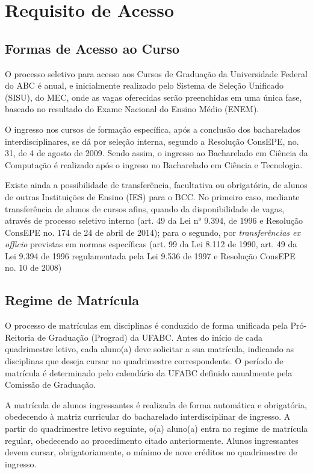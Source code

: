 \section {Requisito de Acesso}

\subsection{Formas de Acesso ao Curso}
O processo seletivo para acesso aos Cursos de Graduação da Universidade Federal do ABC é anual, e inicialmente realizado pelo Sistema de Seleção Unificado (SISU), do MEC, onde as vagas oferecidas serão preenchidas em uma única fase, baseado no resultado do Exame Nacional do Ensino Médio (ENEM).

O ingresso nos cursos de formação específica, após a conclusão dos bacharelados
interdisciplinares, se dá por seleção interna, segundo a Resolução ConsEPE, no. 31, de 4 de agosto de 2009. Sendo assim, o ingresso ao Bacharelado em Ciência da Computação é realizado após o ingreso no Bacharelado em Ciência e Tecnologia.

Existe ainda a possibilidade de transferência, facultativa ou obrigatória, de alunos de outras Instituições de Ensino (IES) para o BCC. No primeiro caso, mediante transferência de alunos de cursos afins, quando da disponibilidade de vagas, através de processo seletivo interno (art. 49 da Lei n° 9.394, de 1996 e Resolução ConsEPE no. 174 de 24 de abril de 2014); para o segundo, por \textit{transferências ex officio} previstas em normas específicas (art. 99 da Lei 8.112 de 1990, art. 49 da Lei 9.394 de 1996 regulamentada pela Lei 9.536 de 1997 e Resolução ConsEPE no. 10 de 2008)

\subsection{Regime de Matrícula}
O processo de matrículas em disciplinas é conduzido de forma unificada pela Pró-Reitoria de Graduação (Prograd) da UFABC. Antes do início de cada quadrimestre letivo, cada aluno(a) deve solicitar a sua matrícula, indicando as disciplinas que deseja cursar no quadrimestre correspondente. O período de matrícula é determinado pelo calendário da UFABC definido anualmente pela Comissão de Graduação.

A matrícula de alunos ingressantes é realizada de forma automática e obrigatória, obedecendo à matriz curricular do bacharelado interdisciplinar de ingresso. A partir do quadrimestre letivo seguinte, o(a) aluno(a) entra no regime de matrícula regular, obedecendo ao procedimento citado anteriormente. Alunos ingressantes devem cursar, obrigatoriamente, o mínimo de nove créditos no quadrimestre de ingresso. 

